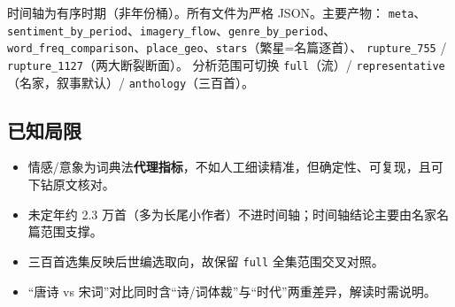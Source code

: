 时间轴为有序时期（非年份桶）。所有文件为严格 JSON。主要产物：
\texttt{meta}、\texttt{sentiment\_by\_period}、\texttt{imagery\_flow}、\texttt{genre\_by\_period}、
\texttt{word\_freq\_comparison}、\texttt{place\_geo}、\texttt{stars}（繁星=名篇逐首）、
\texttt{rupture\_755} / \texttt{rupture\_1127}（两大断裂断面）。
分析范围可切换 \texttt{full}（流）/ \texttt{representative}（名家，叙事默认）/ \texttt{anthology}（三百首）。

\subsection{已知局限}

\begin{itemize}[leftmargin=*, itemsep=0.2em]
    \item 情感/意象为词典法\textbf{代理指标}，不如人工细读精准，但确定性、可复现，且可下钻原文核对。
    \item 未定年约 2.3 万首（多为长尾小作者）不进时间轴；时间轴结论主要由名家名篇范围支撑。
    \item 三百首选集反映后世编选取向，故保留 \texttt{full} 全集范围交叉对照。
    \item “唐诗 vs 宋词”对比同时含“诗/词体裁”与“时代”两重差异，解读时需说明。
\end{itemize}
